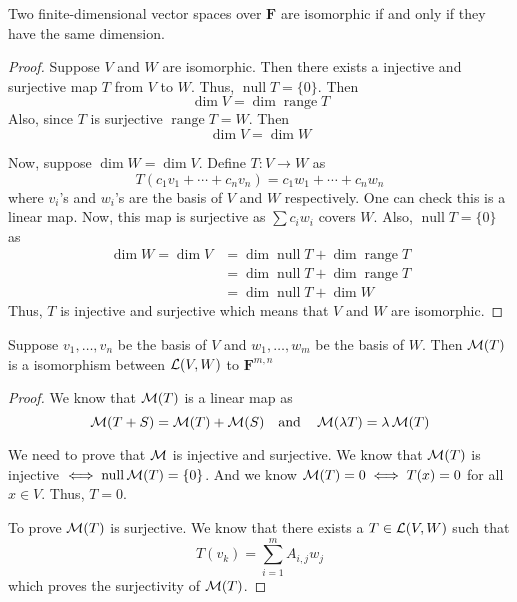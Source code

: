 \begin{proposition}
    Two finite-dimensional vector spaces over $\mathbf{F}$ are isomorphic if and only if they have the same dimension.
\end{proposition}

\begin{proof}
    Suppose $V$ and $W$ are isomorphic. Then there exists a injective and surjective map $T$ from $V$ to $W$.
    Thus, $\operatorname{null} T = \{0\}$. Then
    \[ \dim V = \dim \operatorname{range} T  \]
    Also, since $T$ is surjective $\operatorname{range} T = W$. Then
    \[ \dim V = \dim W \]

    Now, suppose $\dim W = \dim V$. Define $T : V \to W$ as 
    \[ T(c_1 v_1 + \cdots + c_n v_n)=c_1 w_1 + \cdots + c_n w_n \]
    where $v_i$'s and $w_i$'s are the basis of $V$ and $W$ respectively. One can check this is a linear map. Now,
    this map is surjective as $\sum c_i w_i$ covers $W$. Also, $\operatorname{null} T = \{0\}$ as 
    \begin{align*}
        \dim W = \dim V &= \dim \operatorname{null} T + \dim \operatorname{range} T \\ 
        &= \dim \operatorname{null} T + \dim \operatorname{range} T \\
        &= \dim \operatorname{null} T + \dim W
    \end{align*}
    Thus, $T$ is injective and surjective which means that $V$ and $W$ are isomorphic.
\end{proof}

\begin{proposition}
    Suppose $v_1, \ldots, v_n$ be the basis of $V$ and $w_1, \ldots, w_m$ be the basis of $W$. Then $\operatorname{\mathcal{M}}(T)$ is a isomorphism between
    $\operatorname{\mathcal{L}}(V,W)$ to $\mathbf{F}^{m,n}$
\end{proposition}

\begin{proof}
    We know that $\operatorname{\mathcal{M}}(T)$ is a linear map as 
    \[ \operatorname{\mathcal{M}}(T+S) = \operatorname{\mathcal{M}}(T) + \operatorname{\mathcal{M}}(S) \quad \text{and} \quad  \operatorname{\mathcal{M}}(\lambda T ) = \lambda \operatorname{\mathcal{M}}(T) \] 
    
    We need to prove that $\operatorname{\mathcal{M}}$ is injective and surjective. We know that $\operatorname{\mathcal{M}}(T)$ is injective
    $ \iff \operatorname{null} \operatorname{\mathcal{M}}(T) = \{0\}$. And we know $\operatorname{\mathcal{M}}(T)=0 \iff T(x)=0$ for all $x \in V$. Thus, $T = 0$.

    To prove $\operatorname{\mathcal{M}}(T)$ is surjective. We know that there exists a $T \in \operatorname{\mathcal{L}}(V,W)$ such that
    \[ T(v_k) = \sum_{i=1}^{m} A_{i,j} w_j \]
    which proves the surjectivity of $\operatorname{\mathcal{M}}(T)$.
\end{proof}

